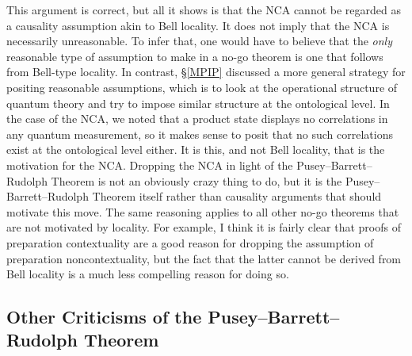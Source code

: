 \documentclass[DIV=calc,fontsize=12pt]{scrartcl} %
\theoremstyle{definition}
\theoremstyle{plain}
\begin{document}
This argument is correct, but all it shows is that the NCA cannot be
regarded as a causality assumption akin to Bell locality.  It does not
imply that the NCA is necessarily unreasonable.  To infer that, one
would have to believe that the \emph{only} reasonable type of
assumption to make in a no-go theorem is one that follows from
Bell-type locality.  In contrast, \S\ref{MPIP} discussed a more
general strategy for positing reasonable assumptions, which is to look
at the operational structure of quantum theory and try to impose
similar structure at the ontological level.  In the case of the NCA,
we noted that a product state displays no correlations in any quantum
measurement, so it makes sense to posit that no such correlations
exist at the ontological level either.  It is this, and not Bell
locality, that is the motivation for the NCA\@.  Dropping the NCA in
light of the Pusey--Barrett--Rudolph Theorem is not an obviously crazy thing to do, but it
is the Pusey--Barrett--Rudolph Theorem itself rather than causality arguments that should
motivate this move.  The same reasoning applies to all other no-go
theorems that are not motivated by locality.  For example, I think it
is fairly clear that proofs of preparation contextuality are a good
reason for dropping the assumption of preparation noncontextuality,
but the fact that the latter cannot be derived from Bell locality is a
much less compelling reason for doing so.

\subsection{Other Criticisms of the Pusey--Barrett--Rudolph Theorem}

\label{OCPusey--Barrett--Rudolph}
\end{document}
